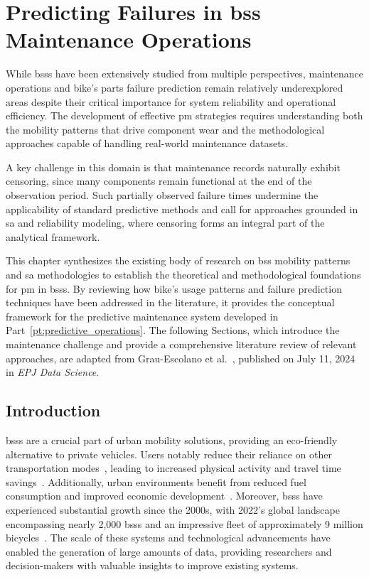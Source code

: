 \chapter[Predicting Failures in BSS Maintenance Operations]{Predicting Failures in \ac{bss} Maintenance Operations}
\label{ch:failure_forecasting}

While \acp{bss} have been extensively studied from multiple perspectives, maintenance operations and bike's parts failure prediction remain relatively underexplored areas despite their critical importance for system reliability and operational efficiency. The development of effective \ac{pm} strategies requires understanding both the mobility patterns that drive component wear and the methodological approaches capable of handling real-world maintenance datasets.

A key challenge in this domain is that maintenance records naturally exhibit censoring, since many components remain functional at the end of the observation period. Such partially observed failure times undermine the applicability of standard predictive methods and call for approaches grounded in \ac{sa} and reliability modeling, where censoring forms an integral part of the analytical framework.

This chapter synthesizes the existing body of research on \ac{bss} mobility patterns and \ac{sa} methodologies to establish the theoretical and methodological foundations for \ac{pm} in \acp{bss}. By reviewing how bike's usage patterns and failure prediction techniques have been addressed in the literature, it provides the conceptual framework for the predictive maintenance system developed in Part~\ref{pt:predictive_operations}. The following Sections, which introduce the maintenance challenge and provide a comprehensive literature review of relevant approaches, are adapted from Grau-Escolano et al.~\cite{Grau-Escolano2024}, published on July 11, 2024 in \textit{EPJ Data Science}.

\section{Introduction}

\acp{bss} are a crucial part of urban mobility solutions, providing an eco-friendly alternative to private vehicles. Users notably reduce their reliance on other transportation modes~\cite{Ma2020}, leading to increased physical activity and travel time savings~\cite{Qiu2018}. Additionally, urban environments benefit from reduced fuel consumption and improved economic development~\cite{Qiu2018}. Moreover, \acp{bss} have experienced substantial growth since the 2000s, with 2022's global landscape encompassing nearly 2,000 \acp{bss} and an impressive fleet of approximately 9 million bicycles~\cite{MeddinWorldMapReport2022}. The scale of these systems and technological advancements have enabled the generation of large amounts of data, providing researchers and decision-makers with valuable insights to improve existing systems.

